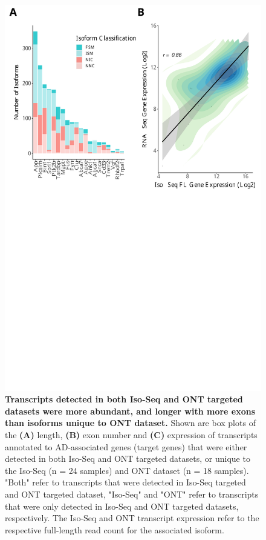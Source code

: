 \begin{figure}[!htp]
	\begin{center}
		\includegraphics[page=4,trim={0 13cm 0 0cm},clip,scale = 0.60]{Figures/ONTvsIsoSeq.pdf}
	\end{center}
	\captionsetup{width=0.95\textwidth}
	\caption[Comparison of commonly-detected and unique isoforms from targeted datasets]%
	{\textbf{Transcripts detected in both Iso-Seq and ONT targeted datasets were more abundant, and longer with more exons than isoforms unique to ONT dataset.} Shown are box plots of the \textbf{(A)} length, \textbf{(B)} exon number and \textbf{(C)} expression of transcripts annotated to AD-associated genes (target genes) that were either detected in both Iso-Seq and ONT targeted datasets, or unique to the Iso-Seq (n = 24 samples) and ONT dataset (n = 18 samples). "Both" refer to transcripts that were detected in Iso-Seq targeted and ONT targeted dataset, "Iso-Seq" and "ONT" refer to transcripts that were only detected in  Iso-Seq and ONT targeted datasets, respectively. The Iso-Seq and ONT transcript expression refer to the respective full-length read count for the associated isoform.}
	\label{fig:ontvsisoseq_description}
\end{figure}

